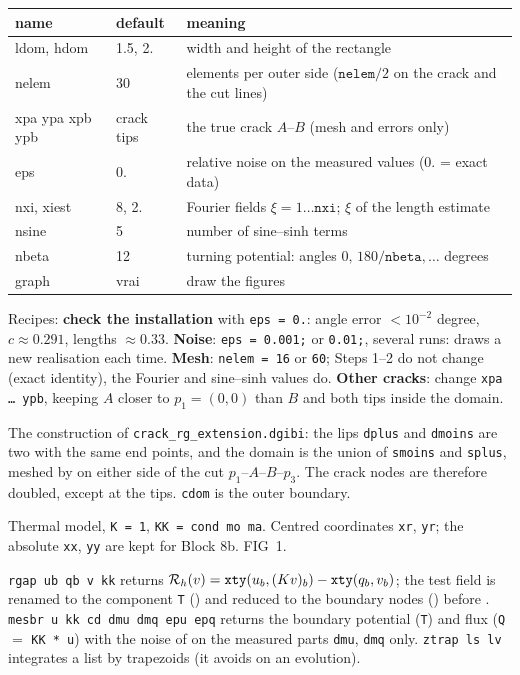 \begin{center}\small
\begin{tabular}{>{\ttfamily}l l p{8cm}}
\toprule
\rmfamily name & default & meaning\\
\midrule
ldom, hdom & 1.5, 2. & width and height of the rectangle\\
nelem & 30 & elements per outer side ($\texttt{nelem}/2$ on the crack and the cut lines)\\
xpa ypa xpb ypb & crack tips & the true crack $A$--$B$ (mesh and errors only)\\
eps & 0. & relative noise on the measured values (0. = exact data)\\
nxi, xiest & 8, 2. & Fourier fields $\xi=1\dots\texttt{nxi}$; $\xi$ of the length estimate\\
nsine & 5 & number of sine--sinh terms\\
nbeta & 12 & turning potential: angles $0,\,180/\texttt{nbeta},\dots$ degrees\\
graph & vrai & draw the figures\\
\bottomrule
\end{tabular}
\end{center}
Recipes: \textbf{check the installation} with \texttt{eps = 0.}: angle error
$<10^{-2}$ degree, $c\approx0.291$, lengths $\approx0.33$. \textbf{Noise}:
\texttt{eps = 0.001;} or \texttt{0.01;}, several runs:  draws a new
realisation each time. \textbf{Mesh}: \texttt{nelem = 16} or \texttt{60}; Steps
1--2 do not change (exact identity), the Fourier and sine--sinh values do.
\textbf{Other cracks}: change \texttt{xpa \dots\ ypb}, keeping $A$ closer to
$p_1=(0,0)$ than $B$ and both tips inside the domain.

 The construction of
\texttt{crack\_rg\_extension.dgibi}: the lips \texttt{dplus} and \texttt{dmoins}
are two  with the same end points, and the domain is the union of
\texttt{smoins} and \texttt{splus}, meshed by  on either side of the cut
$p_1$--$A$--$B$--$p_3$. The crack nodes are therefore doubled, except at the
tips. \texttt{cdom} is the outer boundary.

 Thermal model, \texttt{K = 1}, \texttt{KK = cond mo ma}.
Centred coordinates \texttt{xr}, \texttt{yr}; the absolute \texttt{xx}, \texttt{yy}
are kept for Block 8b. FIG~1.

 \texttt{rgap ub qb v kk} returns
$\mathcal{R}_h(v)=\texttt{xty}(u_b,(Kv)_b)-\texttt{xty}(q_b,v_b)$; the test field is renamed
to the component \texttt{T} () and reduced to the boundary nodes
() before . \texttt{mesbr u kk cd dmu dmq epu epq} returns the
boundary potential (\texttt{T}) and flux (\texttt{Q} $=$ \texttt{KK * u}) with the
noise of  on the measured parts \texttt{dmu}, \texttt{dmq} only.
\texttt{ztrap ls lv} integrates a list by trapezoids (it avoids  on an
evolution).

